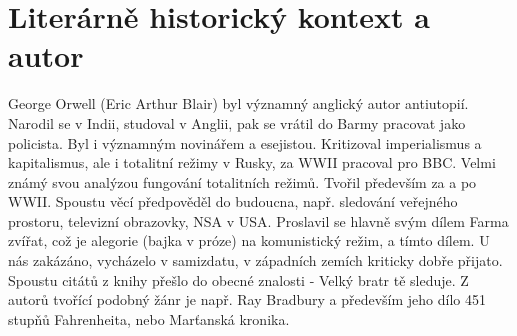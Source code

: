 \documentclass[11pt]{article}
\begin{document}
    \section*{Literárně historický kontext a autor}
    George Orwell (Eric Arthur Blair) byl významný anglický autor antiutopií. Narodil se v Indii, studoval v Anglii, pak se vrátil do Barmy pracovat jako policista.
    Byl i významným novinářem a esejistou. Kritizoval imperialismus a kapitalismus, ale i totalitní režimy v Rusky, za WWII pracoval pro BBC. Velmi známý svou analýzou fungování totalitních režimů.
    Tvořil především za a po WWII.
    Spoustu věcí předpověděl do budoucna, např. sledování veřejného prostoru, televizní obrazovky, NSA v USA. Proslavil se hlavně svým dílem Farma zvířat, což je alegorie (bajka v próze) na komunistický režim, a tímto dílem.
    U nás zakázáno, vycházelo v samizdatu, v západních zemích kriticky dobře přijato. Spoustu citátů z knihy přešlo do obecné znalosti - Velký bratr tě sleduje.
    Z autorů tvořící podobný žánr je např. Ray Bradbury a především jeho dílo 451 stupňů Fahrenheita, nebo Marťanská kronika.
\end{document}
